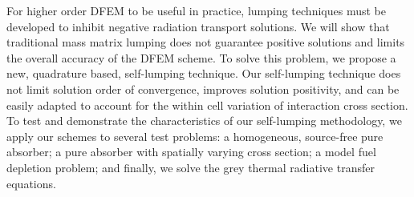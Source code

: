 For higher order DFEM to be useful in practice, lumping techniques must be developed to inhibit negative radiation transport solutions.
We will show that traditional mass matrix lumping does not guarantee positive solutions and limits the overall accuracy of the DFEM scheme.
To solve this problem, we propose a new, quadrature based, self-lumping technique.
Our self-lumping technique does not limit solution order of convergence, improves solution positivity, and can be easily adapted to account for the within cell variation of interaction cross section.
To test and demonstrate the characteristics of our self-lumping methodology, we apply our schemes to several test problems: a homogeneous, source-free pure absorber; a pure absorber with spatially varying cross section; a model fuel depletion problem; and finally, we solve the grey thermal radiative transfer equations.



\pagebreak{}
